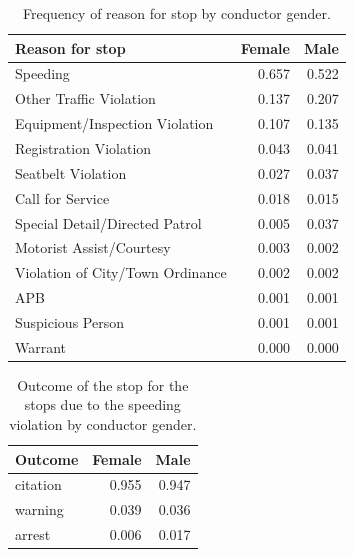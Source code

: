 \documentclass{article}
\begin{document}
\FloatBarrier


\begin{table}[htbp]
\begin{center}
\begin{tabular}{lrr}
\toprule
                  Reason for stop & Female & Male \\
\midrule
                        Speeding &  0.657 & 0.522 \\
         Other Traffic Violation &  0.137 & 0.207 \\
  Equipment/Inspection Violation &  0.107 & 0.135 \\
          Registration Violation &  0.043 & 0.041 \\
              Seatbelt Violation &  0.027 & 0.037 \\
                Call for Service &  0.018 & 0.015 \\
  Special Detail/Directed Patrol &  0.005 & 0.037 \\
        Motorist Assist/Courtesy &  0.003 & 0.002 \\
Violation of City/Town Ordinance &  0.002 & 0.002 \\
                             APB &  0.001 & 0.001 \\
               Suspicious Person &  0.001 & 0.001 \\
                         Warrant &  0.000 & 0.000 \\
\bottomrule
\end{tabular}
\end{center} 
\caption{Frequency of reason for stop by conductor gender.}
\label{tab:reason}
\end{table} 


\begin{table}[htbp]
\begin{center}
\begin{tabular}{lrr}
\toprule
 Outcome & Female &  Male \\
\midrule
citation &  0.955 & 0.947 \\
 warning &  0.039 & 0.036 \\
  arrest &  0.006 & 0.017 \\
\bottomrule
\end{tabular}
\caption{Outcome of the stop for the stops due to the speeding violation by conductor gender.}
\label{tab:outcome}
\end{center}
\end{table} 
\end{document}
